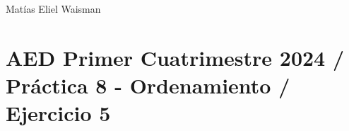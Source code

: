 \documentclass{article}
\begin{document}
\hfill
Matías Eliel Waisman 

\section*{\normalsize{AED Primer Cuatrimestre 2024 / Práctica 8 - Ordenamiento / Ejercicio 5}}
\end{document}
